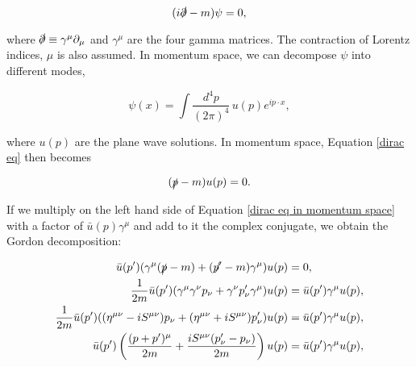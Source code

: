\documentclass{article}
\numberwithin{equation}{section} %
\begin{document}
\begin{equation}
(i\slashed{\partial} -m)\psi=0,
\label{dirac eq}
\end{equation}


\noindent where $\slashed{\partial} \equiv \gamma^\mu\partial_\mu$ and $\gamma^\mu$ are the four gamma matrices. The contraction of Lorentz indices, $\mu$ is also assumed. In momentum space, we can decompose $\psi$ into different modes,

\begin{equation}
\psi(x) = \int \frac{d^4p}{(2\pi)^4} \, u(p) e^{ip\cdot x},
\end{equation}

\noindent where $u(p)$ are the plane wave solutions\cite{tong}. In momentum space, Equation \ref{dirac eq} then becomes

\begin{equation}
(\slashed{p} - m)u(p) = 0.
\label{dirac eq in momentum space}
\end{equation}

\noindent If we multiply on the left hand side of Equation \ref{dirac eq in momentum space} with a factor of $\bar{u}(p)\gamma^\mu$ and add to it the complex conjugate, we obtain the Gordon decomposition:

\begin{equation}
\begin{split}
\bar{u}(p')(\gamma^\mu(\slashed{p}-m) + (\slashed{p'}-m)\gamma^\mu)u(p) &= 0,\\
\frac{1}{2m}\bar{u}(p')(\gamma^\mu\gamma^\nu p_\nu + \gamma^\nu p'_\nu\gamma^\mu)u(p) &= \bar{u}(p')\gamma^\mu u(p),\\
\frac{1}{2m}\bar{u}(p')( (\eta^{\mu\nu} - iS^{\mu\nu})p_\nu + (\eta^{\mu\nu} + iS^{\mu\nu}) p'_\nu)u(p) &= \bar{u}(p')\gamma^\mu u(p),\\
\bar{u}(p')\left( \frac{(p + p')^\mu}{2m} + \frac{iS^{\mu\nu}(p'_\nu - p_\nu)}{2m} \right)u(p) &= \bar{u}(p')\gamma^\mu u(p),
\end{split}
\label{gordon decomposition}
\end{equation}
\end{document}
